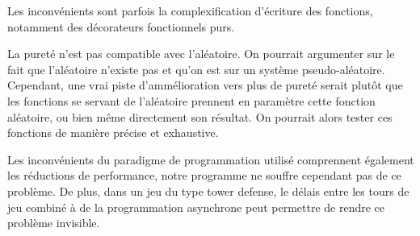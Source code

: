 \documentclass{article}
\begin{document}
Les inconvénients sont parfois la complexification d'écriture des fonctions, notamment des décorateurs fonctionnels purs.

La pureté n'est pas compatible avec l'aléatoire. On pourrait argumenter sur le fait que l'aléatoire n'existe pas et qu'on est sur un système pseudo-aléatoire. Cependant, une vrai piste d'ammélioration vers plus de pureté serait plutôt que les fonctions se servant de l'aléatoire prennent en paramètre cette fonction aléatoire, ou bien même directement son résultat. On pourrait alors tester ces fonctions de manière précise et exhaustive.

Les inconvénients du paradigme de programmation utilisé comprennent également les réductions de performance, notre programme ne souffre cependant pas de ce problème. De plus, dans un jeu du type tower defense, le délais entre les tours de jeu combiné à de la programmation asynchrone peut permettre de rendre ce problème invisible.
\end{document}
